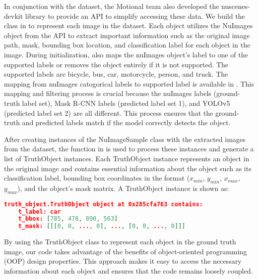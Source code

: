 In conjunction with the dataset, the Motional team also developed the nuscenes-devkit library to provide an API to simplify accessing these data. We build the  class in  to represent each image in the dataset. Each  object utilizes the NuImages object from the API to extract important information such as the original image path, mask, bounding box location, and classification label for each object in the image. During initialization,  also maps the nuImages object's label to one of the supported labels or removes the object entirely if it is not supported. The supported labels are bicycle, bus, car, motorcycle, person, and truck. The mapping from nuImages catogorical labels to supported label is available in . This mapping and filtering process is crucial because the nuImages labels (ground-truth label set), Mask R-CNN labels (predicted label set 1), and YOLOv5 (predicted label set 2) are all different. This process ensures that the ground-truth and predicted labels match if the model correctly detects the object.

After creating instances of the NuImageSample class with the extracted images from the dataset, the  function in  is used to process these instances and generate a list of TruthObject instances. Each TruthObject instance represents an object in the original image and contains essential information about the object such as its classification label, bounding box coordinates in the format ($x_{min}$, $y_{min}$, $x_{max}$, $y_{max}$), and the object's mask matrix. A TruthObject instance is shown as:
\begin{lstlisting}[language=json,firstnumber=1]
truth_object.TruthObject object at 0x285cfa763 contains:
    t_label: car
    t_bbox: [785, 478, 890, 563]
    t_mask: [[[0, 0, ..., 0], ..., [0, 0, ..., 0]]]
\end{lstlisting}
By using the TruthObject class to represent each object in the ground truth image, our code takes advantage of the benefits of object-oriented programming (OOP) design properties. This approach makes it easy to access the necessary information about each object and ensures that the code remains loosely coupled.